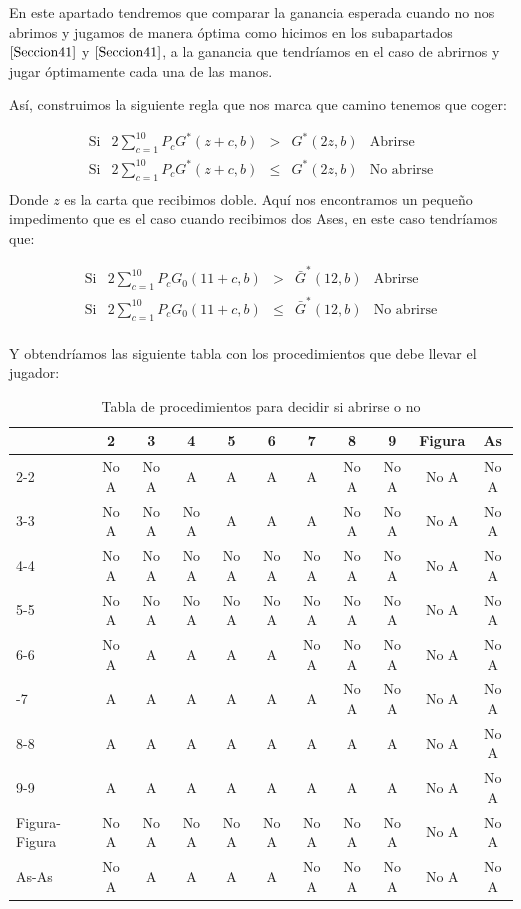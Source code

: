 \documentclass[12pt,a4paper,]{book}
\numberwithin{dummy}{section}
\theoremstyle{ocrenumbox}
\theoremstyle{blacknumex}
\theoremstyle{blacknumbox}
\theoremstyle{ocrenum}
\theoremstyle{ocrenum}
\begin{document}
En este apartado tendremos que comparar la ganancia esperada cuando no
nos abrimos y jugamos de manera óptima como hicimos en los subapartados
\(\ref{Seccion41}\) y \(\ref{Seccion41}\), a la ganancia que tendríamos
en el caso de abrirnos y jugar óptimamente cada una de las manos.

Así, construimos la siguiente regla que nos marca que camino tenemos que
coger:

\[
\begin{array}{cllll}
\text{Si} & 2 \sum_{c=1}^{10}P_cG^*(z+c,b) & > & G^*(2z,b) & \text{Abrirse} \\
\text{Si} & 2 \sum_{c=1}^{10}P_cG^*(z+c,b) & \leq & G^*(2z,b) & \text{No abrirse}\\
\end{array}
\] Donde \(z\) es la carta que recibimos doble. Aquí nos encontramos un
pequeño impedimento que es el caso cuando recibimos dos Ases, en este
caso tendríamos que:

\[
\begin{array}{cllll}
\text{Si} & 2 \sum_{c=1}^{10}P_cG_0(11+c,b) & > & \bar G^*(12,b) & \text{Abrirse} \\
\text{Si} & 2 \sum_{c=1}^{10}P_cG_0(11+c,b) & \leq & \bar G^*(12,b)& \text{No abrirse}\\
\end{array}
\]

Y obtendríamos las siguiente tabla con los procedimientos que debe
llevar el jugador:

\begingroup\fontsize{12}{14}\selectfont

\begin{longtable}[t]{lcccccccccc}
\caption{\label{tab:unnamed-chunk-11}Tabla de procedimientos para decidir si abrirse o no}\\
\toprule
 & 2 & 3 & 4 & 5 & 6 & 7 & 8 & 9 & Figura & As\\
\midrule
2-2 & No A & No A & A & A & A & A & No A & No A & No A & No A\\
3-3 & No A & No A & No A & A & A & A & No A & No A & No A & No A\\
4-4 & No A & No A & No A & No A & No A & No A & No A & No A & No A & No A\\
5-5 & No A & No A & No A & No A & No A & No A & No A & No A & No A & No A\\
6-6 & No A & A & A & A & A & No A & No A & No A & No A & No A\\
\addlinespace
7-7 & A & A & A & A & A & A & No A & No A & No A & No A\\
8-8 & A & A & A & A & A & A & A & A & No A & No A\\
9-9 & A & A & A & A & A & A & A & A & No A & No A\\
Figura-Figura & No A & No A & No A & No A & No A & No A & No A & No A & No A & No A\\
As-As & No A & A & A & A & A & No A & No A & No A & No A & No A\\
\bottomrule
\end{longtable}
\endgroup{}
\end{document}

